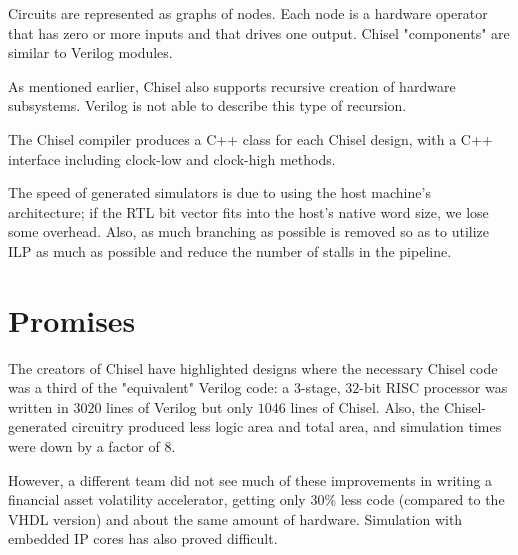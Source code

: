 \documentclass[a4paper,11pt]{article}
\begin{document}
Circuits are represented as graphs of nodes. Each node is a hardware operator that has zero or more inputs and that drives one output. Chisel "components" are similar to Verilog modules.

As mentioned earlier, Chisel also supports recursive creation of hardware subsystems. Verilog is not able to describe this type of recursion.

The Chisel compiler produces a C++ class for each Chisel design, with a C++ interface including clock-low and clock-high methods.

The speed of generated simulators is due to using the host machine's architecture; if the RTL bit vector fits into the host's native word size, we lose some overhead. Also, as much branching as possible is removed so as to utilize ILP as much as possible and reduce the number of stalls in the pipeline.

\section{Promises}

The creators of Chisel have highlighted designs where the necessary Chisel code was a third of the "equivalent" Verilog code: a $3$-stage, $32$-bit RISC processor was written in $3020$ lines of Verilog but only $1046$ lines of Chisel. Also, the Chisel-generated circuitry produced less logic area and total area, and simulation times were down by a factor of $8$.

However, a different team did not see much of these improvements in writing a financial asset volatility accelerator, getting only $30\%$ less code (compared to the VHDL version) and about the same amount of hardware. Simulation with embedded IP cores has also proved difficult.
\end{document}
